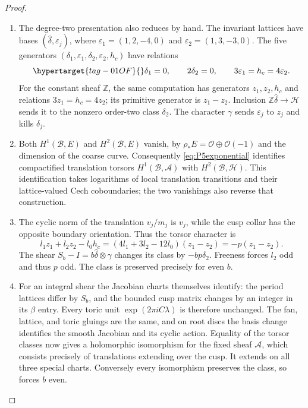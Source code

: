 \begin{proof}
\begin{enumerate}[label=\arabic*.,leftmargin=*]
\item The degree-two presentation also reduces by hand.  The invariant
lattices have bases $(\widehat\delta,\varepsilon_j)$, where
$\varepsilon_1=(1,2,-4,0)$ and $\varepsilon_2=(1,3,-3,0)$.
The five generators $(\delta_1,\varepsilon_1,\delta_2,\varepsilon_2,h_c)$
have relations
\begin{equation}\hypertarget{tag-01OF}{}\label{eq:P5H2}
 \delta_1=0,\qquad 2\delta_2=0,\qquad
 3\varepsilon_1=h_c=4\varepsilon_2.
\end{equation}
For the constant sheaf $\mathbb Z$, the same computation has generators
$z_1,z_2,h_c$ and relations $3z_1=h_c=4z_2$; its primitive generator is
$z_1-z_2$.  Inclusion $\mathbb Z\widehat\delta\to\mathcal H$ sends it
to the nonzero order-two class $\delta_2$.  The character $\gamma$
sends $\varepsilon_j$ to $z_j$ and kills $\delta_j$.

\item Both $H^1(\mathcal B,E)$ and $H^2(\mathcal B,E)$ vanish, by
$\rho_*E=\mathcal O\oplus\mathcal O(-1)$ and the dimension of the coarse
curve.  Consequently \eqref{eq:P5exponential} identifies compactified
translation torsors $H^1(\mathcal B,\mathcal A)$ with
$H^2(\mathcal B,\mathcal H)$.  This identification takes logarithms of
local translation transitions and their lattice-valued Cech
coboundaries; the two vanishings also reverse that construction.

\item The cyclic norm of the translation $v_j/m_j$ is $v_j$, while the cusp
collar has the opposite boundary orientation.  Thus the torsor
character is
\[
 l_1z_1+l_2z_2-l_0h_c
 =(4l_1+3l_2-12l_0)(z_1-z_2)=-p(z_1-z_2).
\]
The shear $S_b-I=b\widehat\delta\otimes\gamma$ changes its class by
$-bp\delta_2$.  Freeness forces $l_2$ odd and thus $p$ odd.  The class
is preserved precisely for even $b$.

\item For an integral shear the Jacobian charts themselves identify: the
period lattices differ by $S_b$, and the bounded cusp matrix changes by
an integer in its $\beta$ entry.  Every toric unit
$\exp(2\pi iC\lambda)$ is therefore unchanged.  The fan, lattice, and
toric gluings are the same, and on root discs the basis change
identifies the smooth Jacobian and its cyclic action.  Equality of the
torsor classes now gives a holomorphic isomorphism for the fixed sheaf
$\mathcal A$, which consists precisely of translations extending over
the cusp.  It extends on all three special charts.  Conversely every
isomorphism preserves the class, so forces $b$ even.
\end{enumerate}
\end{proof}